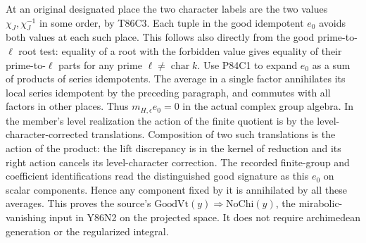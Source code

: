 At an original designated place the two character labels are the two
values $\chi_J,\chi_J^{-1}$ in some order, by T86C3. Each tuple
in the good idempotent $e_0$ avoids both values at each such place.
This follows also directly from the good prime-to-$\ell$ root test:
equality of a root with the forbidden value gives equality of their
prime-to-$\ell$ parts for any prime $\ell\ne\operatorname{char}k$.
Use P84C1 to expand $e_0$ as a sum of products of series idempotents.
The average in a single factor annihilates its local series idempotent
by the preceding paragraph, and commutes with all factors in other
places. Thus $m_{H,\epsilon}e_0=0$ in the actual complex group
algebra. In the member's level realization the action of the finite
quotient is by the level-character-corrected translations. Composition
of two such translations is the action of the product: the lift
discrepancy is in the kernel of reduction and its right action cancels
its level-character correction. The recorded finite-group and
coefficient identifications read the distinguished good signature as
this $e_0$ on scalar components. Hence any component fixed by it
is annihilated by all these averages. This proves the source's
$\mathrm{GoodVt}(y)\Rightarrow\mathrm{NoChi}(y)$, the
mirabolic-vanishing input in Y86N2 on the projected space. It does
not require archimedean generation or the regularized integral.

